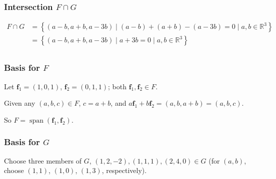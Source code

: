 \documentclass[11pt]{article}
\newcommand{\R}{\mathbb{R}}
\DeclareMathOperator{\Span}{span}
\theoremstyle{definition}
\theoremstyle{plain}
\theoremstyle{remark}
\begin{document}
\begin{enumerate}
          \subsubsection*{Intersection \(F \cap G\)}
          \[
              \begin{aligned}
                  F \cap G
                   & = \left \{
                  (a - b, a + b, a - 3b)
                  \mid (a - b) + (a + b) - (a - 3b) = 0
                  \mid a, b \in \R^3
                  \right \}
                  \\
                   & = \left \{
                  (a - b, a + b, a - 3b)
                  \mid a + 3b = 0
                  \mid a, b \in \R^3
                  \right \}
                  \\
              \end{aligned}
          \]

          \subsubsection*{Basis for \(F\)}

          Let \(\mathbf{f}_1 = (1, 0, 1)\), \(\mathbf{f}_2 = (0, 1, 1)\); both \(\mathbf{f}_1,\mathbf{f}_2 \in F\).

          Given any \((a, b, c) \in F\), \(c = a + b\), and \(a \mathbf{f}_1 + b \mathbf{f}_2 = (a, b, a + b) = (a, b, c)\).

          So \(F = \Span ( \mathbf{f}_1, \mathbf{f}_2 )\).

          \subsubsection*{Basis for \(G\)}

          Choose three members of \(G\), \((1, 2, -2), (1, 1, 1), (2, 4, 0) \in G\) (for \((a, b)\), choose \((1, 1)\), \((1, 0)\),
          \((1, 3)\), respectively).


\end{enumerate}
\end{document}
